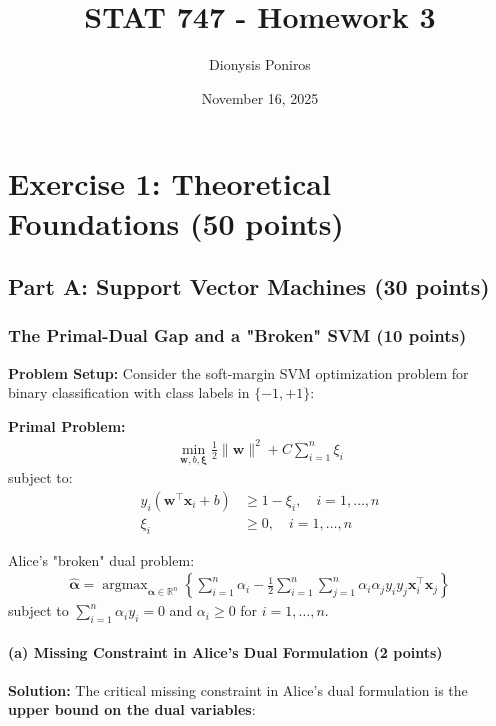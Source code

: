 \documentclass[12pt,a4paper]{article}
\title{STAT 747 - Homework 3}
\author{Dionysis Poniros}
\date{November 16, 2025}
\newcommand{\R}{\mathbb{R}}
\newcommand{\argmax}{\operatorname{argmax}}
\theoremstyle{definition}
\begin{document}
\maketitle
\tableofcontents
\newpage

\section{Exercise 1: Theoretical Foundations (50 points)}

\subsection{Part A: Support Vector Machines (30 points)}

\subsubsection{The Primal-Dual Gap and a "Broken" SVM (10 points)}

\textbf{Problem Setup:} Consider the soft-margin SVM optimization problem for binary classification with class labels in $\{-1, +1\}$:

\textbf{Primal Problem:}
\begin{align}
\min_{\mathbf{w},b,\bm{\xi}} \frac{1}{2}\|\mathbf{w}\|^2 + C\sum_{i=1}^n \xi_i
\end{align}
subject to:
\begin{align}
y_i(\mathbf{w}^\top \mathbf{x}_i + b) &\geq 1 - \xi_i, \quad i = 1,\ldots,n\\
\xi_i &\geq 0, \quad i = 1,\ldots,n
\end{align}

Alice's "broken" dual problem:
\begin{align}
\hat{\bm{\alpha}} = \argmax_{\bm{\alpha} \in \R^n} \left\{\sum_{i=1}^n \alpha_i - \frac{1}{2}\sum_{i=1}^n\sum_{j=1}^n \alpha_i\alpha_j y_i y_j \mathbf{x}_i^\top \mathbf{x}_j\right\}
\end{align}
subject to $\sum_{i=1}^n \alpha_i y_i = 0$ and $\alpha_i \geq 0$ for $i = 1,\ldots,n$.

\paragraph{(a) Missing Constraint in Alice's Dual Formulation (2 points)}

\textbf{Solution:} The critical missing constraint in Alice's dual formulation is the \textbf{upper bound on the dual variables}:
\end{document}
